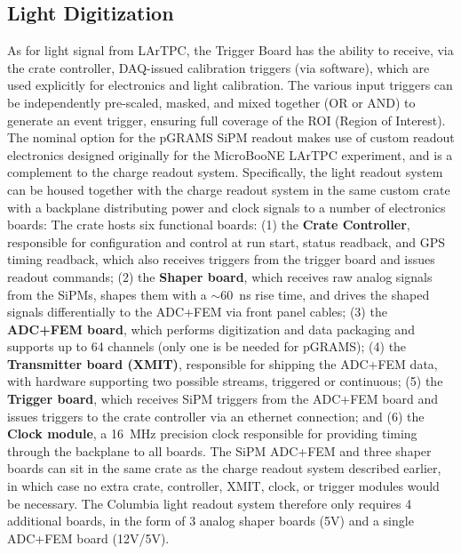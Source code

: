 \documentclass[a4paper,fleqn,longmktitle]{cas-dc}
\begin{document}
\subsection{Light Digitization}\label{chap:DAQ:light}
As for light signal from LArTPC, the Trigger Board has the ability to receive, via the crate controller, DAQ-issued calibration triggers (via software), which are used explicitly for electronics and light calibration. The various input triggers can be independently pre-scaled, masked, and mixed together (OR or AND) to generate an event trigger, ensuring full coverage of the ROI (Region of Interest). 
The nominal option for the pGRAMS SiPM readout makes use of custom readout electronics designed originally for the MicroBooNE LArTPC experiment, and is a complement to the charge readout system. Specifically, the light readout system can be housed together with the charge readout system in the same custom crate with a backplane distributing power and clock signals to a number of electronics boards: The crate hosts six functional boards: (1) the \textbf{Crate Controller}, responsible for configuration and control at run start, status readback, and GPS timing readback, which also receives triggers from the trigger board and issues readout commands; (2) the \textbf{Shaper board}, which receives raw analog signals from the SiPMs, shapes them with a $\sim$60~ns rise time, and drives the shaped signals differentially to the ADC+FEM via front panel cables; (3) the \textbf{ADC+FEM board}, which performs digitization and data packaging and supports up to 64 channels (only one is be needed for pGRAMS); (4) the \textbf{Transmitter board (XMIT)}, responsible for shipping the ADC+FEM data, with hardware supporting two possible streams, triggered or continuous; (5) the \textbf{Trigger board}, which receives SiPM triggers from the ADC+FEM board and issues triggers to the crate controller via an ethernet connection; and (6) the \textbf{Clock module}, a 16~MHz precision clock responsible for providing timing through the backplane to all boards. The SiPM ADC+FEM and three shaper boards can sit in the same crate as the charge readout system described earlier, in which case no extra crate, controller, XMIT, clock, or trigger modules would be necessary. The Columbia light readout system therefore only requires 4 additional boards, in the form of 3 analog shaper boards (5V) and a single ADC+FEM board (12V/5V). 
\end{document}
